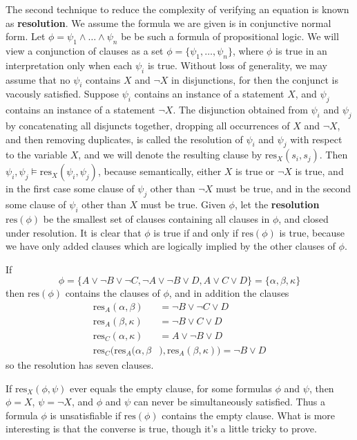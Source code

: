 The second technique to reduce the complexity of verifying an equation is known as {\bf resolution}. We assume the formula we are given is in conjunctive normal form. Let $\phi = \psi_1 \wedge \dots \wedge \psi_n$ be be such a formula of propositional logic. We will view a conjunction of clauses as a set $\phi = \{ \psi_1, \dots, \psi_n \}$, where $\phi$ is true in an interpretation only when each $\psi_i$ is true. Without loss of generality, we may assume that no $\psi_i$ contains $X$ and $\neg X$ in disjunctions, for then the conjunct is vacously satisfied. Suppose $\psi_i$ contains an instance of a statement $X$, and $\psi_j$ contains an instance of a statement $\neg X$. The disjunction obtained from $\psi_i$ and $\psi_j$ by concatenating all disjuncts together, dropping all occurrences of $X$ and $\neg X$, and then removing duplicates, is called the resolution of $\psi_i$ and $\psi_j$ with respect to the variable $X$, and we will denote the resulting clause by $\text{res}_X(s_i,s_j)$. Then $\psi_i, \psi_j \vDash \text{res}_X(\psi_i,\psi_j)$, because semantically, either $X$ is true or $\neg X$ is true, and in the first case some clause of $\psi_j$ other than $\neg X$ must be true, and in the second some clause of $\psi_i$ other than $X$ must be true. Given $\phi$, let the {\bf resolution} $\text{res}(\phi)$ be the smallest set of clauses containing all clauses in $\phi$, and closed under resolution. It is clear that $\phi$ is true if and only if $\text{res}(\phi)$ is true, because we have only added clauses which are logically implied by the other clauses of $\phi$.

\begin{example}
    If
    \[ \phi = \{ A \vee \neg B \vee \neg C, \neg A \vee \neg B \vee D, A \vee C \vee D \} = \{ \alpha, \beta, \kappa \} \]
    then $\text{res}(\phi)$ contains the clauses of $\phi$, and in addition the clauses
    \begin{align*}
        \text{res}_A(\alpha, \beta) &= \neg B \vee \neg C \vee D\\
        \text{res}_A(\beta, \kappa) &= \neg B \vee C \vee D\\
        \text{res}_C(\alpha, \kappa) &= A \vee \neg B \vee D\\
        \text{res}_C(\text{res}_A(\alpha, \beta&), \text{res}_A(\beta, \kappa)) = \neg B \vee D
    \end{align*}
    so the resolution has seven clauses.
\end{example}

If $\text{res}_X(\phi,\psi)$ ever equals the empty clause, for some formulas $\phi$ and $\psi$, then $\phi = X$, $\psi = \neg X$, and $\phi$ and $\psi$ can never be simultaneously satisfied. Thus a formula $\phi$ is unsatisfiable if $\text{res}(\phi)$ contains the empty clause. What is more interesting is that the converse is true, though it's a little tricky to prove.

